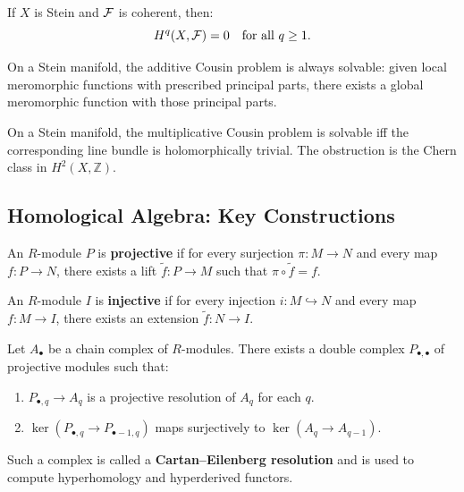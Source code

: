 \begin{theorem}
If $X$ is Stein and $\mathcal{F}$ is coherent, then:
\[
H^q(X, \mathcal{F}) = 0 \quad \text{for all } q \geq 1.
\]
\end{theorem}

\begin{corollary}
On a Stein manifold, the additive Cousin problem is always solvable: given local meromorphic functions with prescribed principal parts, there exists a global meromorphic function with those principal parts.
\end{corollary}

\begin{corollary}
On a Stein manifold, the multiplicative Cousin problem is solvable iff the corresponding line bundle is holomorphically trivial. The obstruction is the Chern class in $H^2(X, \mathbb{Z})$.
\end{corollary}

\subsection{Homological Algebra: Key Constructions}

\begin{definition}
An $R$-module $P$ is \textbf{projective} if for every surjection $\pi: M \to N$ and every map $f: P \to N$, there exists a lift $\tilde{f}: P \to M$ such that $\pi \circ \tilde{f} = f$.
\end{definition}

\begin{definition}
An $R$-module $I$ is \textbf{injective} if for every injection $i: M \hookrightarrow N$ and every map $f: M \to I$, there exists an extension $\tilde{f}: N \to I$.
\end{definition}

\begin{theorem}
Let $A_\bullet$ be a chain complex of $R$-modules. There exists a double complex $P_{\bullet,\bullet}$ of projective modules such that:
\begin{enumerate}
    \item $P_{\bullet,q} \to A_q$ is a projective resolution of $A_q$ for each $q$.
    \item $\ker(P_{\bullet,q} \to P_{\bullet-1,q})$ maps surjectively to $\ker(A_q \to A_{q-1})$.
\end{enumerate}
Such a complex is called a \textbf{Cartan--Eilenberg resolution} and is used to compute hyperhomology and hyperderived functors.
\end{theorem}

